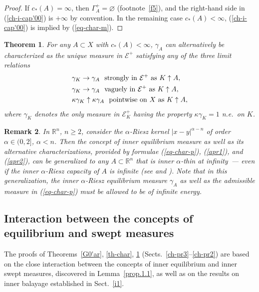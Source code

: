 \documentclass[12pt,a4paper,reqno]{amsart} %
\theoremstyle{lause}
\theoremstyle{maaritelma}
\theoremstyle{lause}
\newtheorem{theorem}{Theorem}[section]
\theoremstyle{maaritelma}
\newtheorem{remark}[theorem]{Remark}
\numberwithin{equation}{section}
\begin{document}
\begin{proof}
  If $c_*(A)=\infty$, then $\Gamma^+_A=\varnothing$ (footnote~\ref{f5}), and the right-hand side in (\ref{ch-i-cap'00}) is $+\infty$ by convention. In the remaining case $c_*(A)<\infty$, (\ref{ch-i-cap'00}) is implied by (\ref{eq-char-m}).
\end{proof}

\begin{theorem}\label{cor2alt}For any\/ $A\subset X$ with\/ $c_*(A)<\infty$, $\gamma_A$ can alternatively be characterized as the unique measure in\/ $\mathcal E^+$ satisfying any of the three limit relations
\begin{align}&\gamma_K\to\gamma_A\text{ \ strongly in\/ $\mathcal E^+$ as\/ $K\uparrow A$},\notag\\
&\gamma_K\to\gamma_A\text{ \ vaguely in\/ $\mathcal E^+$ as\/ $K\uparrow A$},\label{apr1}\\
&\kappa\gamma_K\uparrow\kappa\gamma_A\text{ \ pointwise on\/ $X$  as\/ $K\uparrow A$},\label{apr2}
\end{align}
where\/ $\gamma_K$ denotes the only measure in\/ $\mathcal E^+_K$ having the property\/ $\kappa\gamma_K=1$ n.e.\ on\/ $K$.\end{theorem}

\begin{remark}
In $\mathbb R^n$, $n\geqslant2$, consider the $\alpha$-Riesz kernel $|x-y|^{\alpha-n}$ of order $\alpha\in(0,2]$, $\alpha<n$. Then the concept of inner equilibrium measure as well as its alternative characterizations, provided by formulae (\ref{eq-char-p}), (\ref{apr1}), and (\ref{apr2}), can be generalized to any $A\subset\mathbb R^n$ that is {\it inner\/ $\alpha$-thin at infinity}~--- even if the inner $\alpha$-Riesz capacity of $A$ is {\it infinite\/} (see \cite[Section~5]{Z-bal} and \cite[Sections~1.3, 2.1, 2.3]{Z-bal2}). Note that in this generalization, the inner $\alpha$-Riesz equilibrium measure $\gamma_A$ as well as the admissible measure in (\ref{eq-char-p}) must be allowed to be of {\it infinite\/} energy.
 \end{remark}

\subsection{Interaction between the concepts of equilibrium and swept measures} The proofs of Theorems~\ref{G0'ar}, \ref{th-char}, \ref{cor2alt} (Sects.~\ref{ch-pr3}--\ref{ch-pr2})
are based on the close interaction between the concepts of inner equilibrium and inner swept measures, discovered in Lemma~\ref{prop.1.1}, as well as on the results on inner balayage established in Sect.~\ref{i1}.
\end{document}
